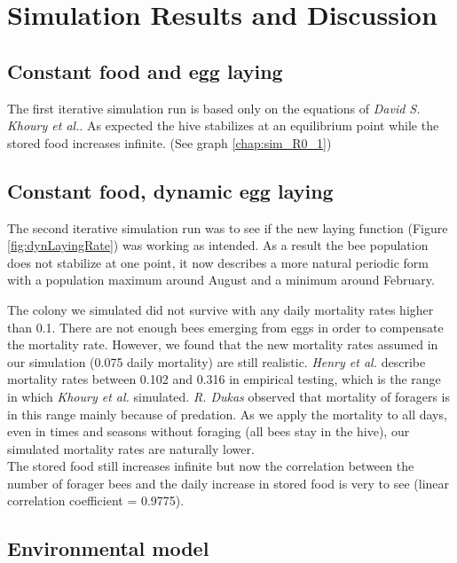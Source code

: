 \section{Simulation Results and Discussion}

\subsection{Constant food and egg laying}
	\label{chap:constantFoodConstantLaying}
	The first iterative simulation run is based only on the equations of \textit{David S. Khoury et al.}\cite{khoury13}. As expected the hive stabilizes at an equilibrium point while the stored food increases infinite. (See graph \ref{chap:sim_R0_1})

\subsection{Constant food, dynamic egg laying}
	\label{chap:constantFoodDynamicLaying}
	The second iterative simulation run was to see if the new laying function (Figure \ref{fig:dynLayingRate})  was working as intended. As a result the bee population does not stabilize at one point, it now describes a more natural periodic form with a population maximum around August and a minimum around February.
	
	The colony we simulated did not survive with any daily mortality rates higher than 0.1. There are not enough bees emerging from eggs in order to compensate the mortality rate. However, we found that the new mortality rates assumed in our simulation (0.075 daily mortality) are still realistic. \textit{Henry et al.} \cite{henry12} describe mortality rates between 0.102 and 0.316 in empirical testing, which is the range in which \textit{Khoury et al.} \cite{khoury13} simulated. \textit{R. Dukas} \cite{dukas08} observed that mortality of foragers is in this range mainly because of predation. As we apply the mortality to all days, even in times and seasons without foraging (all bees stay in the hive), our simulated mortality rates are naturally lower.\\
	
	The stored food still increases infinite but now the correlation between the number of forager bees and the daily increase in stored food is very to see (linear correlation coefficient =  0.9775).

\subsection{Environmental model}
